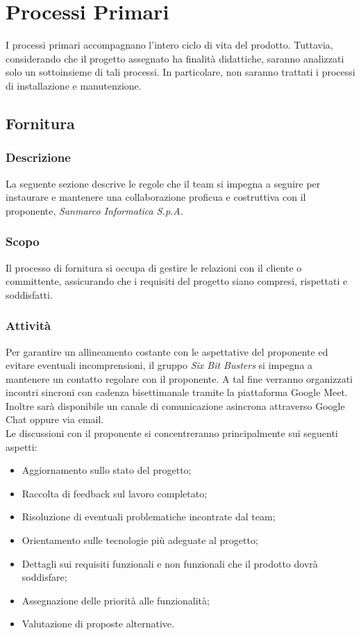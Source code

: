 \section{Processi Primari}
I processi primari accompagnano l'intero ciclo di vita del prodotto. 
Tuttavia, considerando che il progetto assegnato ha finalità didattiche, saranno analizzati solo un sottoinsieme di tali processi. 
In particolare, non saranno trattati i processi di installazione e manutenzione.

\subsection{Fornitura}
\subsubsection{Descrizione}
La seguente sezione descrive le regole che il team si impegna a seguire per
instaurare e mantenere una collaborazione proficua e costruttiva con il
proponente, \textit{Sanmarco Informatica S.p.A.}

\subsubsection{Scopo}
Il processo di fornitura si occupa di gestire le
relazioni con il cliente o committente, assicurando che i requisiti del
progetto siano compresi, rispettati e soddisfatti.

\subsubsection{Attività}
Per garantire un allineamento costante con le aspettative del proponente ed
evitare eventuali incomprensioni, il gruppo \textit{Six Bit Busters} si impegna
a mantenere un contatto regolare con il proponente. A tal fine verranno
organizzati incontri sincroni con cadenza bisettimanale tramite la piattaforma
Google Meet. Inoltre sarà disponibile un canale di comunicazione asincrona
attraverso Google Chat oppure via email.\\

\noindent Le discussioni con il proponente si concentreranno principalmente sui seguenti
aspetti:

\begin{itemize}
    \item Aggiornamento sullo stato del progetto;
    \item Raccolta di feedback sul lavoro completato;
    \item Risoluzione di eventuali problematiche incontrate dal team;
    \item Orientamento sulle tecnologie più adeguate al progetto;
    \item Dettagli sui requisiti funzionali e non funzionali che il prodotto dovrà
          soddisfare;
    \item Assegnazione delle priorità alle funzionalità;
    \item Valutazione di proposte alternative.
\end{itemize}

